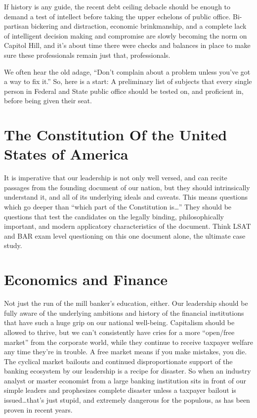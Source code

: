 \documentclass[11pt]{article}
\begin{document}
If history is any guide, the recent debt ceiling debacle should be enough to demand a test of intellect before taking
the upper echelons of public office. Bi-partisan bickering and distraction, economic brinkmanship, and a complete lack
of intelligent decision making and compromise are slowly becoming the norm on Capitol Hill, and it’s about time there
were checks and balances in place to make sure these professionals remain just that, professionals.

We often hear the old adage, “Don’t complain about a problem unless you’ve got a way to fix it.” So, here is a start: A
preliminary list of subjects that every single person in Federal and State public office should be tested on, and
proficient in, before being given their seat.

\section{The Constitution Of the United States of America}

It is imperative that our leadership is not only well versed, and can recite passages from the founding document of our
nation, but they should intrinsically understand it, and all of its underlying ideals and caveats. This means questions
which go deeper than “which part of the Constitution is…” They should be questions that test the candidates on the
legally binding, philosophically important, and modern applicatory characteristics of the document. Think LSAT and BAR
exam level questioning on this one document alone, the ultimate case study.

\section{Economics and Finance}

Not just the run of the mill banker’s education, either. Our leadership should be fully aware of the underlying
ambitions and history of the financial institutions that have such a huge grip on our national well-being. Capitalism
should be allowed to thrive, but we can’t consistently have cries for a more “open/free market” from the corporate
world, while they continue to receive taxpayer welfare any time they’re in trouble. A free market means if you make
mistakes, you die. The cyclical market bailouts and continued disproportionate support of the banking ecosystem by our
leadership is a recipe for disaster. So when an industry analyst or master economist from a large banking institution
sits in front of our simple leaders and prophesizes complete disaster unless a taxpayer bailout is issued…that’s just
stupid, and extremely dangerous for the populous, as has been proven in recent years.
\end{document}
